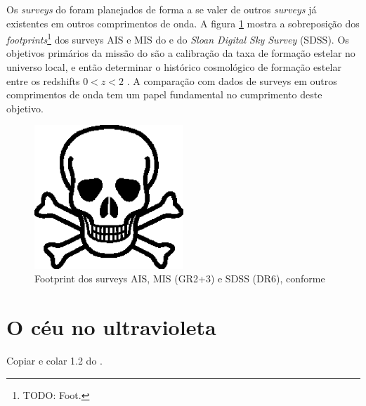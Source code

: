 Os {\em surveys} do \galex foram planejados de forma a se valer de outros {\em
surveys} já existentes em outros comprimentos de onda. A figura
\ref{fig:GalexSDSSOverlap} mostra a sobreposição dos {\em
footprints}\footnote{TODO: Foot.} dos surveys AIS e MIS do \galex e do {\em
Sloan Digital Sky Survey} (SDSS). Os objetivos primários da missão do \galex são
a calibração da taxa de formação estelar no universo local, e então determinar o
histórico cosmológico de formação estelar entre os redshifts $0 < z < 2$
\citep{Martin2005}. A comparação com dados de surveys em outros comprimentos de
onda tem um papel fundamental no cumprimento deste objetivo.

\begin{figure}
	\includegraphics[width=0.5\textwidth]{figuras/test.eps}
	\caption[Footprint dos surveys \galex AIS, MIS e SDSS]
	{Footprint dos surveys \galex AIS, MIS (GR2+3) e SDSS (DR6),
	conforme \cite{Budavari2009}}
	\label{fig:GalexSDSSOverlap}
\end{figure}




\section{O céu no ultravioleta}
\label{sec:Galex:CeuUV}

Copiar e colar 1.2 do \cite{Martin2005}.



